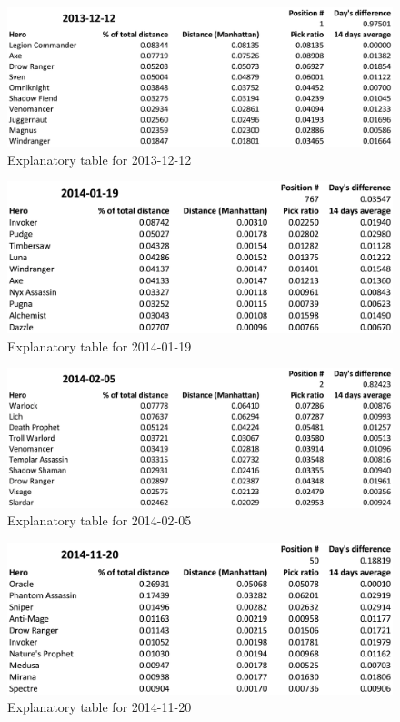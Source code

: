 \begin{figure}[H]
    \centering
    \caption{Explanatory table for 2013-12-12}
    \label{fig:20131212}
    \includegraphics[width=1\textwidth]{20131212.png}
\end{figure}

\begin{figure}[H]
    \centering
    \caption{Explanatory table for 2014-01-19}
    \label{fig:20140119}
    \includegraphics[width=1\textwidth]{20140119.png}
\end{figure}

\begin{figure}[H]
    \centering
    \caption{Explanatory table for 2014-02-05}
    \label{fig:20140205}
    \includegraphics[width=1\textwidth]{20140205.png}
\end{figure}

\begin{figure}[H]
    \centering
    \caption{Explanatory table for 2014-11-20}
    \label{fig:20141120}
    \includegraphics[width=1\textwidth]{20141120.png}
\end{figure}

